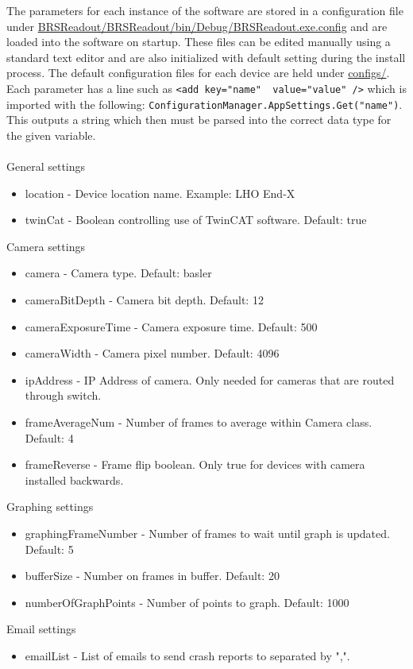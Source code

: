 \documentclass{article}
\begin{document}
The parameters for each instance of the software are stored in a configuration file under \url{BRSReadout/BRSReadout/bin/Debug/BRSReadout.exe.config} and are loaded into the software on startup. These files can be edited manually using a standard text editor and are also initialized with default setting during the install process. The default configuration files for each device are held under \url{configs/}. Each parameter has a line such as \lstinline{<add key="name"  value="value" />} which is imported with the following: \lstinline{ConfigurationManager.AppSettings.Get("name")}. This outputs a string which then must be parsed into the correct data type for the given variable.\\
\\
General settings
\begin{itemize}
\item location - Device location name. Example: LHO End-X
\item twinCat - Boolean controlling use of TwinCAT software. Default: true
\end{itemize}
Camera settings
\begin{itemize}
\item camera - Camera type. Default: basler
\item cameraBitDepth - Camera bit depth. Default: 12
\item cameraExposureTime - Camera exposure time. Default: 500
\item cameraWidth - Camera pixel number. Default: 4096
\item ipAddress - IP Address of camera. Only needed for cameras that are routed through switch.
\item frameAverageNum - Number of frames to average within Camera class. Default: 4
\item frameReverse - Frame flip boolean. Only true for devices with camera installed backwards.
\end{itemize}
Graphing settings
\begin{itemize}
\item graphingFrameNumber - Number of frames to wait until graph is updated. Default: 5
\item bufferSize - Number on frames in buffer. Default: 20
\item numberOfGraphPoints - Number of points to graph. Default: 1000
\end{itemize}
Email settings
\begin{itemize}
\item emailList - List of emails to send crash reports to separated by ",".
\end{itemize}
\end{document}
